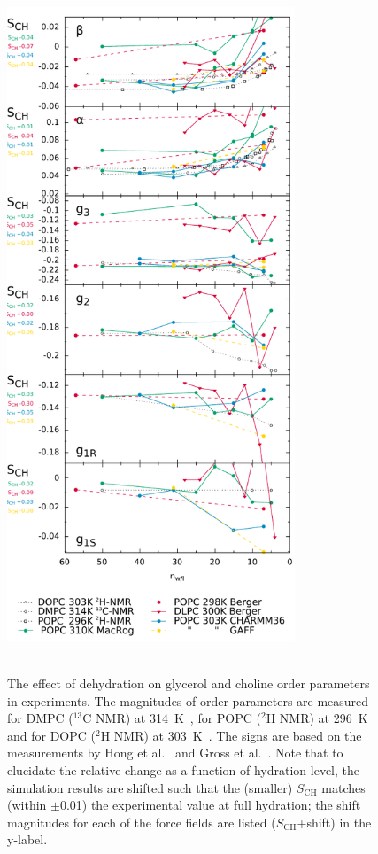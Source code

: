 \documentclass[journal=jacsat,manuscript=article]{achemso}
\begin{document}
\begin{figure}[]
  \centering
  \includegraphics[width=8.6cm]{../DATAreportediINblog/dehydration.pdf} \\
   \\
  \caption{\label{ordPhydr}
    The effect of dehydration on glycerol and choline order parameters in experiments.
    The magnitudes of order parameters are measured for DMPC ($^{13}$C NMR) at 314~K~\cite{dvinskikh05b}, 
    for POPC ($^2$H NMR) at 296~K~\cite{bechinger91} and for DOPC ($^2$H NMR) at 303~K~\cite{ulrich94}. 
    The signs are based on the measurements by Hong et al.~\cite{hong95a,hong95b} 
    and Gross et al.~\cite{gross97}.
    Note that to elucidate the relative change as a function of hydration level,
    the simulation results are shifted such that the (smaller) $S_\mathrm{CH}$
    matches (within $\pm$0.01) the experimental value at full hydration;
    the shift magnitudes for each of the force fields are listed ($S_\mathrm{CH}$+shift) in the y-label.
  }
\end{figure}
\end{document}
